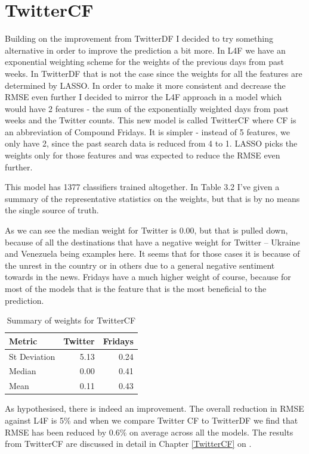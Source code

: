 \documentclass[minf,twoside,singlespacing,parskip,frontabs,notimes,11pt]{infthesis}
\begin{document}
\section{TwitterCF}
\label{sec:cf}

Building on the improvement from TwitterDF I decided to try something alternative in order to improve the prediction a bit more. In L4F we have an exponential weighting scheme for the weights of the previous days from past weeks. In TwitterDF that is not the case since the weights for all the features are determined by LASSO. In order to make it more consistent and decrease the RMSE even further I decided to mirror the L4F approach in a model which would have 2 features - the sum of the exponentially weighted days from past weeks and the Twitter counts. This new model is called TwitterCF where CF is an abbreviation of Compound Fridays. It is simpler - instead of 5 features, we only have 2, since the past search data is reduced from 4 to 1. LASSO picks the weights only for those features and was expected to reduce the RMSE even further. 


This model has 1377 classifiers trained altogether. In Table 3.2 I've given a summary of the representative statistics on the weights, but that is by no means the single source of truth. 

As we can see the median weight for Twitter is 0.00, but that is pulled down, because of all the destinations that have a negative weight for Twitter -- Ukraine and Venezuela being examples here. It seems that for those cases it is because of the unrest in the country or in others due to a general negative sentiment towards in the news. Fridays have a much higher weight of course, because for most of the models that is the feature that is the most beneficial to the prediction. 

\begin{table}[h]
\begin{center}
\begin{tabular}{ l | r | r }
\textbf{Metric} & \textbf{Twitter} & \textbf{Fridays}\\
\hline
St Deviation & 5.13 & 0.24\\
Median & 0.00 & 0.41\\
Mean & 0.11 & 0.43
\end{tabular}
\end{center}
\caption{Summary of weights for TwitterCF}
\end{table}

As hypothesised, there is indeed an improvement. The overall reduction in RMSE against L4F is 5\% and when we compare Twitter CF to TwitterDF we find that RMSE has been reduced by 0.6\% on average across all the models. The results from TwitterCF are discussed in detail in Chapter \ref{TwitterCF} on \pageref{TwitterCF}. 
\end{document}
